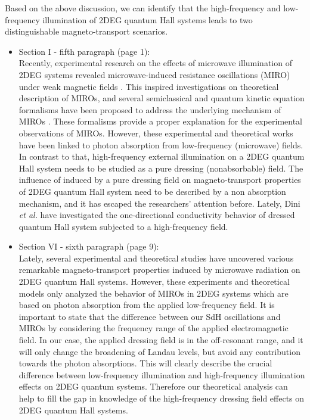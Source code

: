\documentclass{article}
\begin{document}
Based on the above discussion, we can identify that the high-frequency and low-frequency illumination of 2DEG quantum Hall systems leads to two distinguishable
magneto-transport scenarios.

\begin{itemize}
  \item Section I - fifth paragraph (page 1):\\
  {\color{Red}
  Recently, experimental research on the effects of microwave illumination of 2DEG systems revealed microwave-induced resistance oscillations (MIRO) under weak magnetic fields \cite{zudov01,mani02,zudov03,mani04}.
  This inspired investigations on theoretical description of MIROs, and several semiclassical and quantum kinetic equation formalisms have been proposed to address the underlying mechanism of MIROs \cite{durst03,dmitriev03,dmitriev05,dmitriev09}. These formalisms provide a proper explanation for the experimental observations of MIROs. However, these experimental and theoretical works have been linked to photon absorption from low-frequency (microwave) fields.
  In contrast to that, high-frequency external illumination on a 2DEG quantum Hall system needs to be studied as a pure dressing (nonabsorbable) field.
  The influence of induced by a pure dressing field on
magneto-transport properties of 2DEG quantum Hall system need to be described by a non absorption mechanism, and it has escaped the researchers’ attention before.
  Lately, Dini \textit{et al.} \cite{dini16} have investigated the one-directional conductivity behavior of dressed quantum Hall system subjected to a high-frequency field.
  }
  \item Section VI - sixth paragraph (page 9):\\
  {\color{Red}
  Lately, several experimental \cite{zudov01,mani02,zudov03,mani04} and theoretical \cite{durst03,dmitriev03,dmitriev05,dmitriev09} studies have uncovered various remarkable
magneto-transport properties induced by microwave radiation on 2DEG quantum Hall systems. However, these experiments and theoretical models only analyzed the behavior of MIROs in 2DEG systems which are based on photon absorption from the applied low-frequency field.
  It is important to state that the difference between our SdH oscillations and MIROs \cite{zudov01,mani02,zudov03,mani04} by considering the frequency range of the applied electromagnetic field. In our case, the applied dressing field is in the off-resonant range, and it will only change the broadening of Landau levels, but avoid any contribution towards the photon absorptions. This will clearly describe the crucial difference between low-frequency illumination and high-frequency illumination effects on 2DEG quantum systems. Therefore our theoretical analysis can help to fill the gap in knowledge of the high-frequency dressing field effects on 2DEG quantum Hall systems.
  }
\end{itemize}
\end{document}
